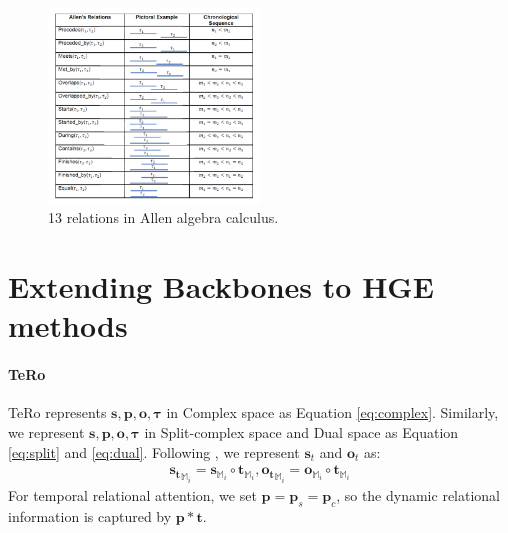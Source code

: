 \documentclass[letterpaper]{article} %
\begin{document}
\begin{figure}[!h]
  \centering
  \includegraphics[width=0.5\textwidth]{allen.pdf}
  \caption{13 relations in Allen algebra calculus.}
  \label{fig:allen relations}
\end{figure}

\section{Extending Backbones to HGE methods}
\paragraph{TeRo}
TeRo \cite{xu2020tero} represents $\boldsymbol{s,p,o, \tau}$ in Complex space as Equation \ref{eq:complex}. Similarly, we represent $\boldsymbol{s,p,o, \tau}$ in Split-complex space and Dual space as Equation \ref{eq:split} and \ref{eq:dual}. Following \cite{xu2020tero}, we represent $\boldsymbol{s}_{t}$ and $\boldsymbol{o}_{t}$ as:
\begin{equation}
\begin{aligned}
        \boldsymbol{s_{t}}_{\mathbb{M}_{i}}= \boldsymbol{s}_{\mathbb{M}_{i}} \circ \boldsymbol{t}_{\mathbb{M}_{i}},
                \boldsymbol{o_{t}}_{\mathbb{M}_{i}}= \boldsymbol{o}_{\mathbb{M}_{i}} \circ \boldsymbol{t}_{\mathbb{M}_{i}}
\end{aligned}
\end{equation}
For temporal relational attention, we set $\boldsymbol{p} = \boldsymbol{p}_{s} = \boldsymbol{p}_{c}$, so the dynamic relational information is captured by $\boldsymbol{p}*\boldsymbol{t}$.
\end{document}

